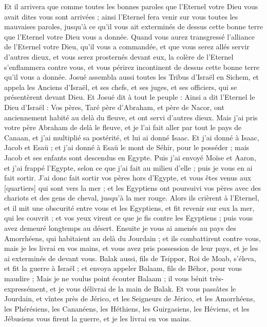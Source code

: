 \begin{multicols}{2}
Et il arrivera que comme toutes les bonnes paroles que l'Eternel votre Dieu vous avait dites vous sont arrivées ; ainsi l'Eternel fera venir sur vous toutes les mauvaises paroles, jusqu'à ce qu'il vous ait exterminés de dessus cette bonne terre que l'Eternel votre Dieu vous a donnée.
Quand vous aurez transgressé l'alliance de l'Eternel votre Dieu, qu'il vous a commandée, et que vous serez allés servir d'autres dieux, et vous serez prosternés devant eux, la colère de l'Eternel s'enflammera contre vous, et vous périrez incontinent de dessus cette bonne terre qu'il vous a donnée.
\VerseOne{}Josué assembla aussi toutes les Tribus d'Israël en Sichem, et appela les Anciens d'Israël, et ses chefs, et ses juges, et ses officiers, qui se présentèrent devant Dieu.
Et Josué dit à tout le peuple : Ainsi a dit l'Eternel le Dieu d'Israël : Vos pères, Taré père d'Abraham, et père de Nacor, ont anciennement habité au delà du fleuve, et ont servi d'autres dieux.
Mais j'ai pris votre père Abraham de delà le fleuve, et je l'ai fait aller par tout le pays de Canaan, et j'ai multiplié sa postérité, et lui ai donné Isaac.
Et j'ai donné à Isaac, Jacob et Esaü ; et j'ai donné à Esaü le mont de Séhir, pour le posséder ; mais Jacob et ses enfants sont descendus en Egypte.
Puis j'ai envoyé Moïse et Aaron, et j'ai frappé l'Egypte, selon ce que j'ai fait au milieu d'elle ; puis je vous en ai fait sortir.
J'ai donc fait sortir vos pères hors d'Egypte, et vous êtes venus aux [quartiers] qui sont vers la mer ; et les Egyptiens ont poursuivi vos pères avec des chariots et des gens de cheval, jusqu'à la mer rouge.
Alors ils crièrent à l'Eternel, et il mit une obscurité entre vous et les Egyptiens, et fit revenir sur eux la mer, qui les couvrit ; et vos yeux virent ce que je fis contre les Egyptiens ; puis vous avez demeuré longtemps au désert.
Ensuite je vous ai amenés au pays des Amorrhéens, qui habitaient au delà du Jourdain ; et ils combattirent contre vous, mais je les livrai en vos mains, et vous avez pris possession de leur pays, et je les ai exterminés de devant vous.
Balak aussi, fils de Tsippor, Roi de Moab, s'éleva, et fit la guerre à Israël ; et envoya appeler Balaam, fils de Béhor, pour vous maudire ;
Mais je ne voulus point écouter Balaam ; il vous bénit très-expressément, et je vous délivrai de la main de Balak.
Et vous passâtes le Jourdain, et vîntes près de Jérico, et les Seigneurs de Jérico, et les Amorrhéens, les Phérésiens, les Cananéens, les Héthiens, les Guirgasiens, les Héviens, et les Jébusiens vous firent la guerre, et je les livrai en vos mains.

\end{multicols}

